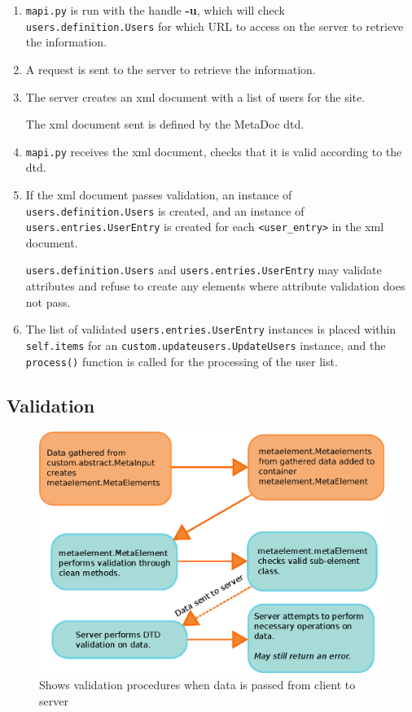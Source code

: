 \begin{enumerate}
    \item
        \texttt{mapi.py} is run with the handle \textbf{-u}, which will check
        \texttt{users.definition.Users} for which URL to access on the server
        to retrieve the information.
    \item
        A request is sent to the server to retrieve the information.
    \item
        The server creates an \gls{xml} document with a list of users for the
        site.
        
        The \gls{xml} document sent is defined by the MetaDoc \gls{dtd}.
    \item
        \texttt{mapi.py} receives the \gls{xml} document, checks that it is
        valid according to the \gls{dtd}. 
    \item
        If the \gls{xml} document passes validation, an instance of
        \texttt{users.definition.Users} is created, and an instance of
        \texttt{users.entries.UserEntry} is created for each
        \texttt{<user\_entry>} in the \gls{xml} document.

        \texttt{users.definition.Users} and \texttt{users.entries.UserEntry}
        may validate attributes and refuse to create any elements where
        attribute validation does not pass.
    \item
        The list of validated \texttt{users.entries.UserEntry} instances is
        placed within \texttt{self.items} for an
        \texttt{custom.updateusers.UpdateUsers} instance, and the
        \texttt{process()} function is called for the processing of the user
        list.
\end{enumerate}

\subsection{Validation}

\begin{figure}[h!]
    \includegraphics[width=\textwidth]{img/site_information_flow}
    \caption{Shows validation procedures when data is passed from client to
    server}
    \label{fig:site_information_flow}
\end{figure}

